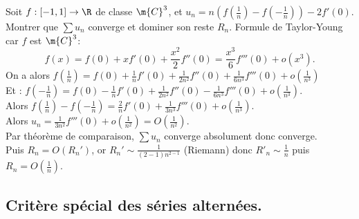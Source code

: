 \documentclass[11pt]{article}
\begin{document}
\begin{ex}{}{}
    Soit $f:[-1,1]\to\R$ de classe $\m{C}^3$, et $u_n=n\left( f\left( \frac{1}{n} \right) - f\left( -\frac{1}{n} \right) \right)-2f'(0)$.\\
    Montrer que $\sum u_n$ converge et dominer son reste $R_n$.
    \tcblower
    Formule de Taylor-Young car $f$ est $\m{C}^3$:
    \begin{equation*}
        f(x)=f(0)+xf'(0)+\frac{x^2}{2}f''(0)=\frac{x^3}{6}f'''(0) + o(x^3).
    \end{equation*}
    On a alors $f\left( \frac{1}{n} \right) = f(0)+\frac{1}{n}f'(0)+\frac{1}{2n^2}f''(0)+\frac{1}{6n^3}f'''(0)+o(\frac{1}{n^3})$\\
    Et : $f\left( -\frac{1}{n} \right) = f(0)-\frac{1}{n}f'(0)+\frac{1}{2n^2}f''(0)-\frac{1}{6n^3}f'''(0)+o(\frac{1}{n^3})$.\\
    Alors $f\left( \frac{1}{n} \right) - f\left( -\frac{1}{n} \right) = \frac{2}{n}f'(0) + \frac{1}{3n^3}f'''(0)+o(\frac{1}{n^3})$.\\
    Alors $u_n = \frac{1}{3n^2}f'''(0)+o\left( \frac{1}{n^2} \right) = O\left( \frac{1}{n^2} \right)$.\\
    Par théorème de comparaison, $\sum u_n$ converge absolument donc converge.\\
    Puis $R_n=O(R_n')$, or $R_n'\sim\frac{1}{(2-1)n^{2-1}}$ (Riemann) donc $R'_n\sim\frac{1}{n}$ puis $R_n=O(\frac{1}{n})$.
\end{ex}

\vspace*{-0.7cm}

\subsection{Critère spécial des séries alternées.}
\end{document}
